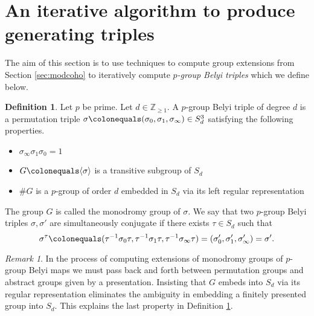 \documentclass{dcthesis}
\newcommand{\ZZ}{\mathbb Z}
\newcommand{\defi}[1]{\textsf{#1}}
\numberwithin{equation}{section}
\theoremstyle{definition}
\newtheorem{definition}[equation]{Definition}
\theoremstyle{remark}
\newtheorem{remark}[equation]{Remark}
\begin{document}
{  \section{An iterative algorithm to produce generating triples}{\label{sec:triplesalgorithm}
    The aim of this section is to use
    techniques to compute group
    extensions from Section \ref{sec:modcoho}
    to iteratively
    compute \emph{$p$-group Belyi triples}
    which we define below.
    \begin{definition}
      \label{def:pgroupbelyitriple}
      Let $p$ be prime.
      Let $d\in\ZZ_{\geq 1}$.
      A \defi{$p$-group Belyi triple
      of degree $d$}
      is a permutation triple
      $\sigma\colonequals
      (\sigma_0,\sigma_1,\sigma_\infty)\in S_d^3$
      satisfying the following properties.
      \begin{itemize}
        \item
          $\sigma_\infty\sigma_1\sigma_0=1$
        \item
          $G\colonequals\langle\sigma\rangle$ is a transitive
          subgroup of $S_d$
        \item
          $\#G$ is a $p$-group
          of order $d$
          embedded in $S_d$
          via its left regular representation
      \end{itemize}
      The group $G$ is called the
      \defi{monodromy group of $\sigma$}.
      We say that two $p$-group Belyi triples
      $\sigma,\sigma'$ are \defi{simultaneously
      conjugate} if there exists $\tau\in S_d$ such that
      \begin{equation}\label{eqn:simconjbelyitriple}
        \sigma^\tau \colonequals
        (\tau^{-1}\sigma_0\tau, \tau^{-1}\sigma_1\tau, \tau^{-1}\sigma_\infty\tau)
        = \left(\sigma'_0,\sigma'_1,\sigma'_\infty\right)
        = \sigma'.
      \end{equation}
    \end{definition}
    \begin{remark}
      \label{rmk:leftregularrepn}
      In the process of computing extensions of
      monodromy groups of $p$-group Belyi maps
      we must pass back and forth
      between permutation groups
      and
      abstract groups given by a presentation.
      Insisting that $G$ embeds into $S_d$
      via its regular representation
      eliminates the ambiguity
      in embedding a finitely presented group
      into $S_d$.
      This explains the last property
      in Definition \ref{def:pgroupbelyitriple}.
    \end{remark}
}}
\end{document}
